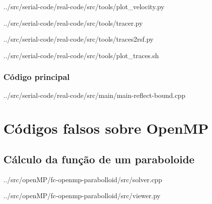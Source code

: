 	     
	     {../src/serial-code/real-code/src/tools/plot_velocity.py}

	     
	     {../src/serial-code/real-code/src/tools/tracer.py}
	     
	     
	     {../src/serial-code/real-code/src/tools/traces2rsf.py}
	     
	     
	     {../src/serial-code/real-code/src/tools/plot_traces.sh}
	
	\subsection{Código principal}
	     
	     {../src/serial-code/real-code/src/main/main-reflect-bound.cpp}
	
\chapter{Códigos falsos sobre OpenMP}
\section{Cálculo da função de um paraboloide}

     
     {../src/openMP/fc-openmp-parabolloid/src/solver.cpp}
     
     
     {../src/openMP/fc-openmp-parabolloid/src/viewer.py}

